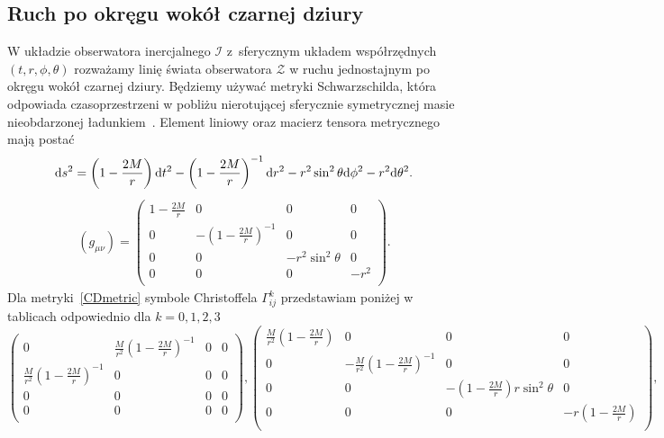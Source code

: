 \subsection{Ruch po okręgu wokół czarnej dziury}
W układzie obserwatora inercjalnego $\mathcal{I}$ z~sferycznym układem
współrzędnych $(t,r,\phi,\theta)$ rozważamy linię świata 
obserwatora $\mathcal{Z}$ w ruchu jednostajnym po okręgu wokół czarnej dziury.
Będziemy używać metryki Schwarzschilda, która odpowiada 
czasoprzestrzeni w pobliżu nierotującej sferycznie symetrycznej masie 
nieobdarzonej ładunkiem~\cite{hartle2016}. 
Element liniowy oraz macierz tensora metrycznego mają postać
\begin{align} \label{CDlin}
\text{d} s^2 = 
 \left(1-\frac{2 M}{r}\right) \text{d} t^2 
 -\left(1-\frac{2 M}{r}\right)^{-1} \text{d} r^2 
 -r^2 \sin ^2\theta\text{d} \phi^2 
 -r^2 \text{d} \theta^2.
\end{align}
\begin{align}\label{CDmetric}
(g_{\mu\nu}) = \left(
\begin{array}{cccc}
 1-\frac{2 M}{r} & 0 & 0 & 0 \\
 0 & -\left(1-\frac{2 M}{r}\right)^{-1} & 0 & 0 \\
 0 & 0 & -r^2 \sin ^2\theta  & 0 \\
 0 & 0 & 0 & -r^2 \\
\end{array}
\right).
\end{align}
Dla metryki~\eqref{CDmetric} symbole Christoffela $\Gamma^k _{ij}$ 
przedstawiam poniżej w tablicach odpowiednio dla $k=0,1,2,3$
$$
\left(
\begin{array}{cccc}
 0 & \frac{M}{r^2}\left( 1 - \frac{2M}{r}  \right)^{-1}& 0 & 0 \\
 \frac{M}{r^2}\left( 1 - \frac{2M}{r}  \right)^{-1} & 0 & 0 & 0 \\
 0 & 0 & 0 & 0 \\
 0 & 0 & 0 & 0 \\
\end{array}
\right),\left(
\begin{array}{cccc}
 \frac{M}{r^2}\left( 1 - \frac{2M}{r}  \right) & 0 & 0 & 0 \\
 0 &-\frac{M}{r^2}\left( 1 - \frac{2M}{r}  \right)^{-1} & 0 & 0 \\
 0 & 0 & -\left(1-\frac{2M}{r}\right)r \sin ^2\theta  & 0 \\
 0 & 0 & 0 & -r \left(1-\frac{2M}{r}\right) \\
\end{array}
\right),
$$
